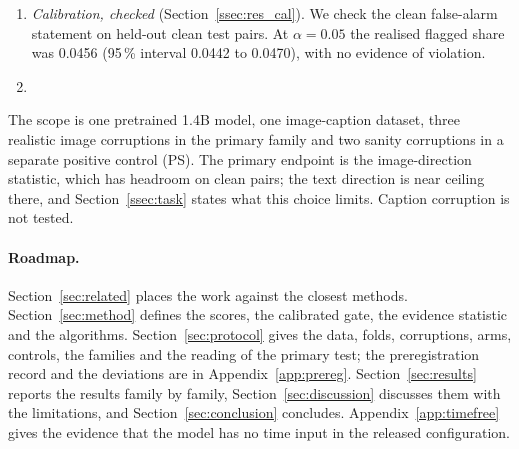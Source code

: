 \begin{enumerate}
but is near chance on JPEG and Gaussian noise (0.561 and 0.503).
On noise it is below a one-pass score without finetuning (0.607; the marginal 95\,\% intervals, 0.493--0.513 and 0.597--0.618, do
not overlap; no paired test was run), and on JPEG the two overlap (0.561, 0.547--0.575, against 0.581, 0.569--0.593).
In the preregistered comparison it is below a texture score whose sign was chosen on the same items (0.756 and 0.768), so the
preregistered falsifier for the score was met.
\item \emph{Calibration, checked} (Section~\ref{ssec:res_cal}). We check the clean false-alarm statement on held-out clean test
pairs.
At $\alpha=0.05$ the realised flagged share was 0.0456 (95\,\% interval 0.0442 to 0.0470), with no evidence of violation.
\item {}
\end{enumerate}
The scope is one pretrained 1.4B model, one image-caption dataset, three realistic image corruptions in the primary family and
two sanity corruptions in a separate positive control (PS).
The primary endpoint is the image-direction statistic, which has headroom on clean pairs; the text direction is near ceiling
there, and Section~\ref{ssec:task} states what this choice limits.
Caption corruption is not tested.


\paragraph{Roadmap.}
Section~\ref{sec:related} places the work against the closest methods.
Section~\ref{sec:method} defines the scores, the calibrated gate, the evidence statistic and the algorithms.
Section~\ref{sec:protocol} gives the data, folds, corruptions, arms, controls, the families and the reading of the primary test;
the preregistration record and the deviations are in Appendix~\ref{app:prereg}.
Section~\ref{sec:results} reports the results family by family, Section~\ref{sec:discussion} discusses them with the limitations,
and Section~\ref{sec:conclusion} concludes.
Appendix~\ref{app:timefree} gives the evidence that the model has no time input in the released configuration.
